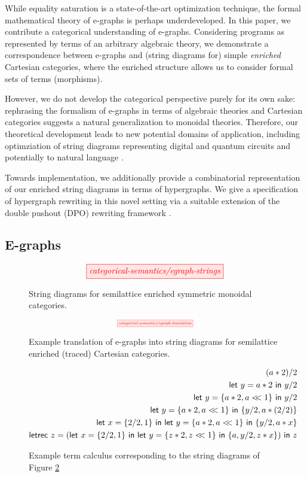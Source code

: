 While equality saturation is a state-of-the-art optimization technique, the formal mathematical theory of e-graphs is perhaps underdeveloped. In this paper, we contribute a categorical understanding of e-graphs. Considering programs as represented by terms of an arbitrary algebraic theory, we demonstrate a correspondence between e-graphs and (string diagrams for) simple \textit{enriched} Cartesian categories, where the enriched structure allows us to consider formal sets of terms (morphisms). 

However, we do not develop the categorical perspective purely for its own sake: rephrasing the formalism of e-graphs in terms of algebraic theories and Cartesian categories suggests a natural generalization to monoidal theories. Therefore, our theoretical development leads to new potential domains of application, including optimziation of string diagrams representing digital \cite{ghica_compositional_2023} and quantum circuits
\cite{coecke_interacting_2011,ZX} and potentially to natural language \cite{wazni_quantum_2022,coecke_lambek_2013}.

Towards implementation, we 
additionally provide a combinatorial representation of our enriched string diagrams in terms of hypergraphs. We give a specification of hypergraph rewriting in this novel setting via a suitable extension of the double pushout (DPO) rewriting framework 
\cite{bonchi_string_2022-1,bonchi_string_2022-2,bonchi_string_2022}.


\subsection*{E-graphs}

\begin{figure}\label{fig:egraph-strings}
\[
    \tikzfig{categorical-semantics/egraph-strings}
\]
\caption{String diagrams for semilattice enriched symmetric monoidal categories.}
\end{figure}

\begin{figure}\label{fig:e-graph-example}
\[
    \scalebox{0.5}{
    \tikzfig{categorical-semantics/egraph-translation}
    }
\]
\caption{Example translation of e-graphs into string diagrams for semilattice enriched (traced) Cartesian categories.}
\end{figure}

\begin{figure}\label{fig:let-calculus}
\begin{align*}
    (a*2)/2 \\
    \mylet{y}{a*2} y/2 \\ 
    \mylet{y}{\{a*2,a<\!\!<1\}} y/2 \\
    \mylet{y}{\{a*2,a<\!\!<1\}} \{y/2, a*(2/2)\} \\
    \mylet{x}{\{2/2, 1\}} \mylet{y}{\{a*2, a <\!\!< 1\}} \{y/2, a*x\} \\
    \textsf{letrec } z = (\mylet{x}{\{2/2, 1\}} \mylet{y}{\{z*2, z <\!\!< 1\}} \{a, y/2, z*x\}) \textsf{ in } z
\end{align*}
\caption{Example term calculus corresponding to the string diagrams of Figure \ref{fig:e-graph-example}}
\end{figure}

